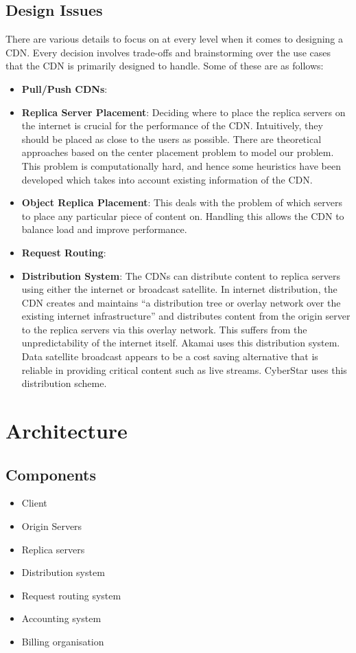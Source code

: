\documentclass[12pt]{article}
\begin{document}
\subsection{Design Issues}
There are various details to focus on at every level when it comes to designing a CDN. Every decision involves trade-offs and brainstorming over the use cases that the CDN is primarily designed to handle. Some of these are as follows:
\begin{itemize}
\item \textbf{Pull/Push CDNs}:

\item \textbf{Replica Server Placement}: Deciding where to place the replica servers on the internet is crucial for the performance of the CDN. Intuitively, they should be placed as close to the users as possible. There are theoretical approaches based on the center placement problem to model our problem. This problem is computationally hard, and hence some heuristics have been developed which takes into account existing information of the CDN.

\item \textbf{Object Replica Placement}: This deals with the problem of which servers to place any particular piece of content on. Handling this allows the CDN to balance load and improve performance.

\item \textbf{Request Routing}:

\item \textbf{Distribution System}: The CDNs can distribute content to replica servers using either the internet or broadcast satellite. In internet distribution, the CDN creates and maintains “a distribution tree or overlay network over the existing internet infrastructure” and distributes content from the origin server to the replica servers via this overlay network. This suffers from the unpredictability of the internet itself. Akamai uses this distribution system. Data satellite broadcast appears to be a cost saving alternative that is reliable in providing critical content such as live streams. CyberStar uses this distribution scheme.

\end{itemize}

\section{Architecture}
\subsection{Components}
\begin{itemize}
    \item Client
    \item Origin Servers
    \item Replica servers
    \item Distribution system
    \item Request routing system
    \item Accounting system
    \item Billing organisation
\end{itemize}
\end{document}
